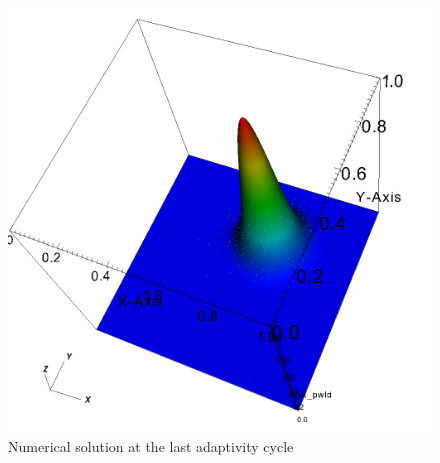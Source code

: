 \documentclass[preprint,10pt]{elsarticle}
\begin{document}
\begin{figure}[!hbtp]
\centering
\includegraphics[scale=0.15]{../pwld_diffusion/results/amr/special/amr0005}
\caption{Numerical solution at the last adaptivity cycle}
\label{fig:amr_sol}
\end{figure}
\end{document}

